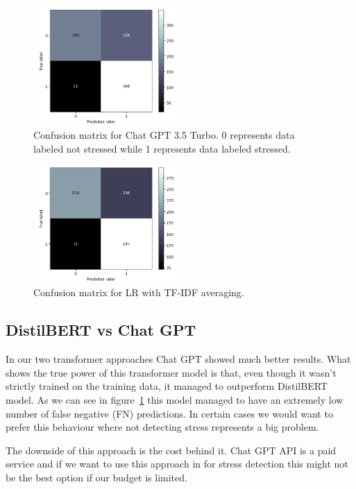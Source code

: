 \documentclass[10pt, a4paper]{article}
\begin{document}
\begin{figure}
    \centering
    \includegraphics[width=0.5\textwidth]{images/conf-matrix-chatgpt}
    \caption{Confusion matrix for Chat GPT 3.5 Turbo. 0 represents data labeled not stressed while 1 represents data labeled stressed.}
    \label{fig:chat-gpt-conf-matrix}
\end{figure}

\begin{figure}
    \centering
    \includegraphics[width=0.5\textwidth]{images/conf-matrix-logreg}
    \caption{Confusion matrix for LR with TF-IDF averaging.}
    \label{fig:logreg-conf-matrix}
\end{figure}


\subsection{DistilBERT vs Chat GPT}
In our two transformer approaches Chat GPT showed much better results.
What shows the true power of this transformer model is that, even though it wasn't strictly trained on the training data, it managed to outperform DistilBERT model.
As we can see in figure~\ref{fig:chat-gpt-conf-matrix} this model managed to have an extremely low number of false negative (FN) predictions.
In certain cases we would want to prefer this behaviour where not detecting stress represents a big problem.

The downside of this approach is the cost behind it.
Chat GPT API is a paid service and if we want to use this approach in for stress detection this might not be the best option if our budget is limited.
\end{document}
